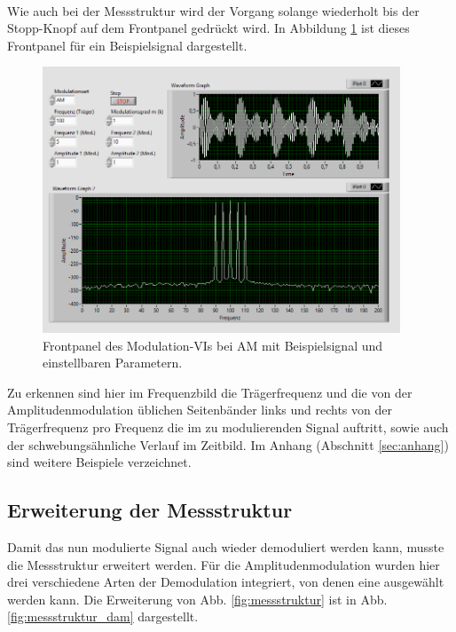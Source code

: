 		\
		
		Wie auch bei der Messstruktur wird der Vorgang solange wiederholt bis der Stopp-Knopf auf dem Frontpanel gedrückt wird.  
		In Abbildung \ref{fig:am_example} ist dieses Frontpanel für ein Beispielsignal dargestellt.
		
		\begin{figure}[H]
			\centering
			\includegraphics[width=0.95\textwidth]{pic/am_example.png}
			\caption{Frontpanel des Modulation-VIs bei AM mit Beispielsignal und einstellbaren Parametern.}
			\label{fig:am_example}	
		\end{figure} 
		
		Zu erkennen sind hier im Frequenzbild die Trägerfrequenz und die von der Amplitudenmodulation üblichen Seitenbänder links und rechts von der Trägerfrequenz pro Frequenz die im zu modulierenden Signal auftritt, sowie auch der schwebungsähnliche Verlauf im Zeitbild.
		Im Anhang (Abschnitt \ref*{sec:anhang}) sind weitere Beispiele verzeichnet.
		
	\subsection{Erweiterung der Messstruktur}
		
		Damit das nun modulierte Signal auch wieder demoduliert werden kann, musste die Messstruktur erweitert werden.
		Für die Amplitudenmodulation wurden hier drei verschiedene Arten der Demodulation integriert, von denen eine ausgewählt werden kann.
		Die Erweiterung von Abb. \ref{fig:messstruktur} ist in Abb. \ref{fig:messstruktur_dam} dargestellt.
			
		\
		
